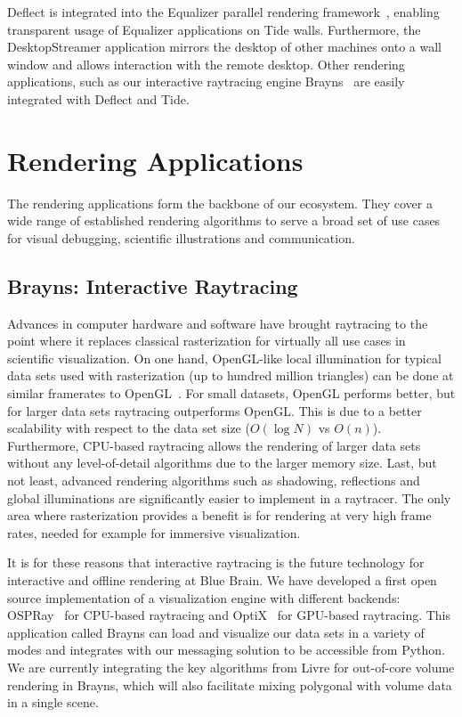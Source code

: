 \documentclass[10pt]{llncs}
\begin{document}
Deflect is integrated into the Equalizer parallel rendering
framework~\cite{EMP:09}, enabling transparent usage of Equalizer applications on
Tide walls. Furthermore, the DesktopStreamer application mirrors the desktop of
other machines onto a wall window and allows interaction with the remote
desktop. Other rendering applications, such as our interactive raytracing
engine Brayns~\cite{brayns} are easily integrated with Deflect and Tide.


\section{Rendering Applications}

The rendering applications form the backbone of our ecosystem. They cover a
wide range of established rendering algorithms to serve a broad set of use
cases for visual debugging, scientific illustrations and communication.

\subsection{Brayns: Interactive Raytracing}

Advances in computer hardware and software have brought raytracing to the point
where it replaces classical rasterization for virtually all use cases in
scientific visualization. On one hand, OpenGL-like local illumination for
typical data sets used with rasterization (up to hundred million triangles) can
be done at similar framerates to OpenGL~\cite{ospray}. For small datasets,
OpenGL performs better, but for larger data sets raytracing outperforms OpenGL.
This is due to a better scalability with respect to the data set size
($O(\log{N})$ vs $O(n)$). Furthermore, CPU-based raytracing allows the rendering
of larger data sets without any level-of-detail algorithms due to the larger
memory size. Last, but not least, advanced rendering algorithms such as
shadowing, reflections and global illuminations are significantly easier to
implement in a raytracer. The only area where rasterization provides a benefit
is for rendering at very high frame rates, needed for example for immersive
visualization.

It is for these reasons that interactive raytracing is the future technology for
interactive and offline rendering at Blue Brain. We have developed a first open
source implementation of a visualization engine with different backends:
OSPRay~\cite{ospray} for CPU-based raytracing and OptiX~\cite{optix} for
GPU-based raytracing. This application called Brayns can load and visualize our
data sets in a variety of modes and integrates with our messaging solution to be
accessible from Python. We are currently integrating the key algorithms from
Livre for out-of-core volume rendering in Brayns, which will also facilitate
mixing polygonal with volume data in a single scene.
\end{document}
